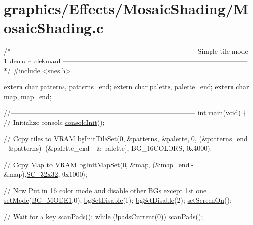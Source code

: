 \hypertarget{a00406}{}\section{graphics/\+Effects/\+Mosaic\+Shading/\+Mosaic\+Shading.\+c}

\begin{DoxyCodeInclude}
\textcolor{comment}{/*---------------------------------------------------------------------------------}
\textcolor{comment}{}
\textcolor{comment}{}
\textcolor{comment}{    Simple tile mode 1 demo}
\textcolor{comment}{    -- alekmaul}
\textcolor{comment}{}
\textcolor{comment}{}
\textcolor{comment}{---------------------------------------------------------------------------------*/}
\textcolor{preprocessor}{#include <\hyperlink{a00356}{snes.h}>}

\textcolor{keyword}{extern} \textcolor{keywordtype}{char} patterns, patterns\_end;
\textcolor{keyword}{extern} \textcolor{keywordtype}{char} palette, palette\_end;
\textcolor{keyword}{extern} \textcolor{keywordtype}{char} map, map\_end;

\textcolor{comment}{//---------------------------------------------------------------------------------}
\textcolor{keywordtype}{int} main(\textcolor{keywordtype}{void}) \{
    \textcolor{comment}{// Initialize console}
    \hyperlink{a00320_a6047713bb5a73afd3cd1d77e336bcdad}{consoleInit}();

    \textcolor{comment}{// Copy tiles to VRAM}
    \hyperlink{a00317_ae09a7ac09be78eef0f28a6c7aabc82ad}{bgInitTileSet}(0, &patterns, &palette, 0, (&patterns\_end - &patterns), (&palette\_end - &
      palette), BG\_16COLORS, 0x4000);

    \textcolor{comment}{// Copy Map to VRAM}
    \hyperlink{a00317_acc385296e159449a81d18f5e219c8032}{bgInitMapSet}(0, &map, (&map\_end - &map),\hyperlink{a00317_a11724b6748ce0954e9b43819263537fc}{SC\_32x32}, 0x1000);

    \textcolor{comment}{// Now Put in 16 color mode and disable other BGs except 1st one}
    \hyperlink{a00353_afd9e46ae627d055dd8c98a4b0ebb73b1}{setMode}(\hyperlink{a00317_a05c862edb7f8f75036f10c04dcc3c2a6}{BG\_MODE1},0); \hyperlink{a00317_a4dbfb1b8854ff9ca4a7d11a899281bbb}{bgSetDisable}(1); 
      \hyperlink{a00317_a4dbfb1b8854ff9ca4a7d11a899281bbb}{bgSetDisable}(2);
    \hyperlink{a00353_abc7d4ef8ebc22f5b710927909bb3f144}{setScreenOn}();
    
    \textcolor{comment}{// Wait for a key}
    \hyperlink{a00335_a42632e79292dc47a567aab4dc3e4407d}{scanPads}(); \textcolor{keywordflow}{while} (!\hyperlink{a00335_a6063e0eec9a36e437fc32951acafa44c}{padsCurrent}(0)) \hyperlink{a00335_a42632e79292dc47a567aab4dc3e4407d}{scanPads}(); 
    

\end{DoxyCodeInclude}
